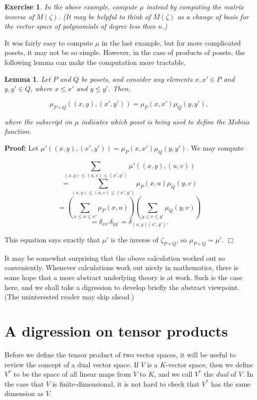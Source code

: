 \documentclass[11pt]{article}
\newtheorem{lemma}[theorem]{Lemma}
\newtheorem{exercise}[theorem]{Exercise}
\newenvironment{proof}{\noindent \textbf{Proof:}}{$\Box$}
\begin{document}
\begin{exercise}
In the above example, compute $\mu$ instead by computing the matrix
inverse of $M(\zeta)$. (It may be helpful to think of $M(\zeta)$ as a
change of basis for the vector space of polynomials of degree less
than $n$.)
\end{exercise}

It was fairly easy to compute $\mu$ in the last example, but for more
complicated posets, it may not be so simple. However, in the case of
products of posets, the following lemma can make the computation more
tractable.

\begin{lemma} \label{product formula}
Let $P$ and $Q$ be posets, and consider any elements $x, x' \in P$ and
$y, y' \in Q$, where $x \le x'$ and $y \le y'$. Then,

\[ \mu_{P \times Q} \left( (x, y), (x', y') \right) = \mu_P(x, x') \mu_Q(y, y'), \]

where the subscript on $\mu$ indicates which poset is being used to
define the Mobius function.
\end{lemma}

\begin{proof}
Let $\mu' \left( (x, y), (x', y') \right) = \mu_P(x, x') \mu_Q(y,
y')$. We may compute

\[ \sum_{(x, y) \le (u, v) \le (x', y')} \mu' \left( (x, y), (u, v) \right) \]
\[ = \sum_{(x, y) \le (u, v) \le (x', y')} \mu_P(x, u) \mu_Q(y, v) \]
\[ = \left( \sum_{x \le u \le x'} \mu_P(x, u) \right) \left( \sum_{y \le v \le y'} \mu_Q(y, v) \right) \]
\[ = \delta_{xx'} \delta_{yy'} = \delta_{(x, y)(x', y')}. \]

This equation says exactly that $\mu'$ is the inverse of $\zeta_{P
  \times Q}$, so $\mu_{P \times Q} = \mu'$.
\end{proof}

It may be somewhat surprising that the above calculation worked out so
conveniently. Whenever calculations work out nicely in mathematics,
there is some hope that a more abstract underlying theory is at
work. Such is the case here, and we shall take a digression to develop
briefly the abstract viewpoint. (The uninterested reader may skip
ahead.)

\section{A digression on tensor products}

Before we define the tensor product of two vector spaces, it will be
useful to review the concept of a dual vector space. If $V$ is a
$K$-vector space, then we define $V^*$ to be the space of all linear
maps from $V$ to $K$, and we call $V^*$ the \emph{dual} of $V$. In the
case that $V$ is finite-dimensional, it is not hard to check that
$V^*$ has the same dimension as $V$.
\end{document}
